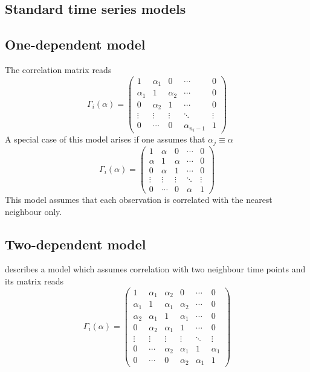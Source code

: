 \subsection{Standard time series models}

\subsection*{One-dependent model}

The correlation matrix reads
\[
 \Gamma_i(\alpha) =
 \begin{pmatrix}
  	1 		& \alpha_1 	& 0 			& \cdots 		& 0 \\
	\alpha_1	& 1 			& \alpha_2 	& \cdots 		& 0 \\
	0		& \alpha_2	& 1 			& \cdots 		& 0 \\
	\vdots 	& \vdots		& \vdots		& \ddots		& \vdots \\
	0		& \cdots		& 0			& \alpha_{n_i-1}	& 1 	
 \end{pmatrix}
\]
A special case of this model arises if one assumes that $\alpha_j \equiv \alpha$
\[
 \Gamma_i(\alpha) =
 \begin{pmatrix}
  	1 		& \alpha	 	& 0 			& \cdots 		& 0 \\
	\alpha	& 1 			& \alpha	 	& \cdots 		& 0 \\
	0		& \alpha		& 1 			& \cdots 		& 0 \\
	\vdots 	& \vdots		& \vdots		& \ddots		& \vdots \\
	0		& \cdots		& 0			& \alpha		& 1 	
 \end{pmatrix}
\]
This model assumes that each observation is correlated with the nearest neighbour only.

\subsection*{Two-dependent model}

\cite{Bonate:2011fk} describes a model which assumes correlation with two neighbour time points
and its matrix reads
\[
 \Gamma_i(\alpha) =
 \begin{pmatrix}
  	1 		& \alpha_1 	& \alpha_2 	& 0 			& \cdots 		& 0 \\
	\alpha_1	& 1 			& \alpha_1 	& \alpha_2	& \cdots 		& 0 \\
	\alpha_2	& \alpha_1	& 1 			& \alpha_1 	& \cdots		& 0 \\
	0		& \alpha_2	& \alpha_1	& 1 			& \cdots 		& 0 \\
	\vdots 	& \vdots		& \vdots		& \vdots		& \ddots		& \vdots \\
	0		& \cdots		& \alpha_2	& \alpha_1	& 1			& \alpha_1 	\\
	0		& \cdots		& 0			& \alpha_2	& \alpha_1	& 1 	
 \end{pmatrix}
\]


